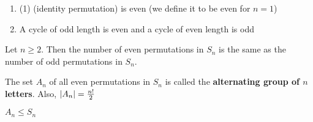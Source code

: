 \begin{remark} \phantom{blank} 
    \begin{enumerate}
        \item (1) (identity permutation) is even (we define it to be even for $n = 1$) 
        \item A cycle of odd length is even and a cycle of even length is odd
    \end{enumerate}
\end{remark}

\begin{theorem}
    Let $n \geq 2$. Then the number of even permutations in $S_n$ is the same as the number of odd permutations in $S_n$.
\end{theorem}

\begin{definition}
    The set $A_n$ of all even permutations in $S_n$ is called the \textbf{alternating group of $n$ letters}. Also, $\qty|A_n| = \frac{n!}{2}$
\end{definition}

\begin{theorem}
    $A_n \leq S_n$
\end{theorem}